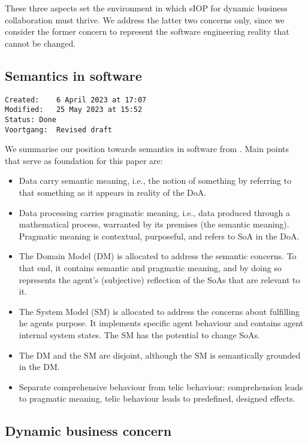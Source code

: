\documentclass[sort&compress,preprint,3p,authoryear,twocolumn]{elsarticle}
\providecommand{\tightlist}{%
  \setlength{\itemsep}{0pt}\setlength{\parskip}{0pt}}
\theoremstyle{break}			%
\begin{document}
These three aspects set the environment in which sIOP for dynamic
business collaboration must thrive. We address the latter two concerns
only, since we consider the former concern to represent the software
engineering reality that cannot be changed.

\subsection{Semantics in software}\label{semantics-in-software}

\begin{verbatim}
Created:    6 April 2023 at 17:07
Modified:   25 May 2023 at 15:52
Status: Done
Voortgang:  Revised draft
\end{verbatim}

We summarise our position towards semantics in software from
\citep{Brandt2021a}. Main points that serve as foundation for this paper
are:

\begin{itemize}
\tightlist
\item
  Data carry semantic meaning, i.e., the notion of something by
  referring to that something as it appears in reality of the DoA.
\item
  Data processing carries pragmatic meaning, i.e., data produced through
  a mathematical process, warranted by its premises (the semantic
  meaning). Pragmatic meaning is contextual, purposeful, and refers to
  SoA in the DoA.
\item
  The Domain Model (DM) is allocated to address the semantic concerns.
  To that end, it contains semantic and pragmatic meaning, and by doing
  so represents the agent's (subjective) reflection of the SoAs that are
  relevant to it.
\item
  The System Model (SM) is allocated to address the concerns about
  fulfilling he agents purpose. It implements specific agent behaviour
  and contains agent internal system states. The SM has the potential to
  change SoAs.
\item
  The DM and the SM are disjoint, although the SM is semantically
  grounded in the DM.
\item
  Separate comprehensive behaviour from telic behaviour: comprehension
  leads to pragmatic meaning, telic behaviour leads to predefined,
  designed effects.
\end{itemize}

\subsection{Dynamic business concern}\label{dynamic-business-concern}
\end{document}
